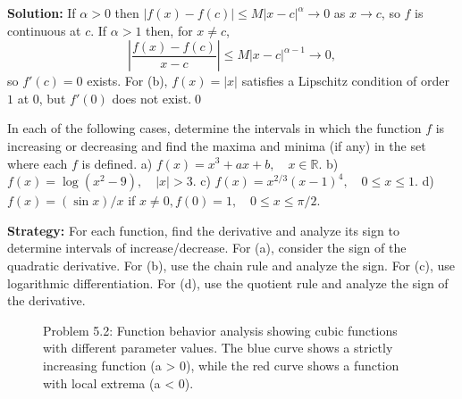 \bigskip\noindent\textbf{Solution:}
If $\alpha>0$ then $|f(x)-f(c)|\le M|x-c|^{\alpha}\to 0$ as $x\to c$, so $f$ is continuous at $c$. If $\alpha>1$ then, for $x\ne c$,
\[\left|\frac{f(x)-f(c)}{x-c}\right|\le M|x-c|^{\alpha-1}\to 0,\]
so $f'(c)=0$ exists. For (b), $f(x)=|x|$ satisfies a Lipschitz condition of order $1$ at $0$, but $f'(0)$ does not exist.\qed


\begin{problembox}
In each of the following cases, determine the intervals in which the function \( f \) is increasing or decreasing and find the maxima and minima (if any) in the set where each \( f \) is defined.
a) \( f(x) = x^3 + ax + b, \quad x \in \mathbb{R} \).
b) \( f(x) = \log (x^2 - 9), \quad |x| > 3 \).
c) \( f(x) = x^{2/3}(x - 1)^4, \quad 0 \leq x \leq 1 \).
d) \( f(x) = (\sin x)/x \) if \( x \neq 0, f(0) = 1, \quad 0 \leq x \leq \pi /2 \).
\end{problembox}

\noindent\textbf{Strategy:} For each function, find the derivative and analyze its sign to determine intervals of increase/decrease. For (a), consider the sign of the quadratic derivative. For (b), use the chain rule and analyze the sign. For (c), use logarithmic differentiation. For (d), use the quotient rule and analyze the sign of the derivative.

\begin{figure}[h]
\centering
{}
\caption{Problem 5.2: Function behavior analysis showing cubic functions with different parameter values. The blue curve shows a strictly increasing function (a > 0), while the red curve shows a function with local extrema (a < 0).}
\end{figure}

